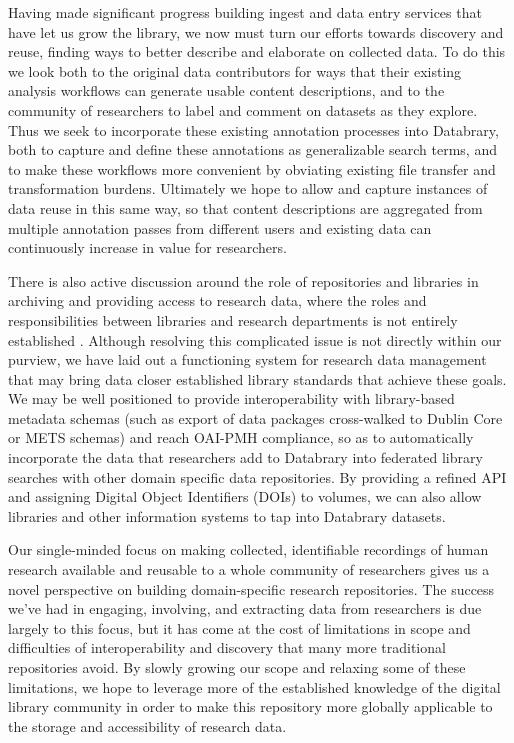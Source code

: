 \documentclass{sig-alternate}
\begin{document}
Having made significant progress building ingest and data entry services that have let us grow the library, we now must turn our efforts towards discovery and reuse, finding ways to better describe and elaborate on collected data.
To do this we look both to the original data contributors for ways that their existing analysis workflows can generate usable content descriptions, and to the community of researchers to label and comment on datasets as they explore.
Thus we seek to incorporate these existing annotation processes into Databrary, both to capture and define these annotations as generalizable search terms, and to make these workflows more convenient by obviating existing file transfer and transformation burdens.
Ultimately we hope to allow and capture instances of data reuse in this same way, so that content descriptions are aggregated from multiple annotation passes from different users and existing data can continuously increase in value for researchers.

There is also active discussion around the role of repositories and libraries in archiving and providing access to research data, where the roles and responsibilities between libraries and research departments is not entirely established \cite{Castelli_etal_2013, Nielson_Hjørland_2014, Macmillan_2014, Pinfield_etal_2014}.
Although resolving this complicated issue is not directly within our purview, we have laid out a functioning system for research data management that may bring data closer established library standards that achieve these goals.
We may be well positioned to provide interoperability with library-based metadata schemas (such as export of data packages cross-walked to Dublin Core or METS schemas) and reach OAI-PMH compliance, so as to automatically incorporate the data that researchers add to Databrary into federated library searches with other domain specific data repositories.
By providing a refined API and assigning Digital Object Identifiers (DOIs) to volumes, we can also allow libraries and other information systems to tap into Databrary datasets.

Our single-minded focus on making collected, identifiable recordings of human research available and reusable to a whole community of researchers gives us a novel perspective on building domain-specific research repositories.
The success we've had in engaging, involving, and extracting data from researchers is due largely to this focus, but it has come at the cost of limitations in scope and difficulties of interoperability and discovery that many more traditional repositories avoid.
By slowly growing our scope and relaxing some of these limitations, we hope to leverage more of the established knowledge of the digital library community in order to make this repository more globally applicable to the storage and accessibility of research data.
\end{document}

